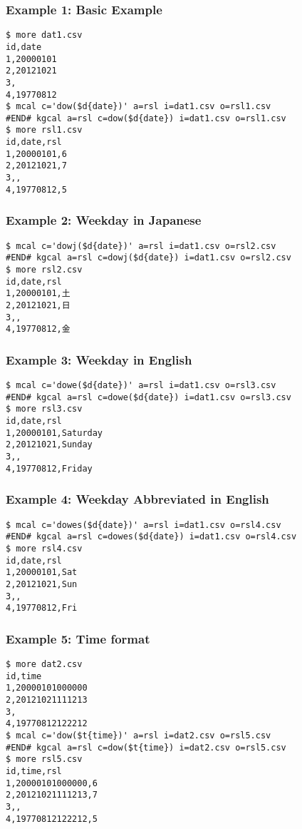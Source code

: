 \subsubsection*{Example 1: Basic Example}



\begin{Verbatim}[baselinestretch=0.7,frame=single]
$ more dat1.csv
id,date
1,20000101
2,20121021
3,
4,19770812
$ mcal c='dow($d{date})' a=rsl i=dat1.csv o=rsl1.csv
#END# kgcal a=rsl c=dow($d{date}) i=dat1.csv o=rsl1.csv
$ more rsl1.csv
id,date,rsl
1,20000101,6
2,20121021,7
3,,
4,19770812,5
\end{Verbatim}
\subsubsection*{Example 2: Weekday in Japanese }



\begin{Verbatim}[baselinestretch=0.7,frame=single]
$ mcal c='dowj($d{date})' a=rsl i=dat1.csv o=rsl2.csv
#END# kgcal a=rsl c=dowj($d{date}) i=dat1.csv o=rsl2.csv
$ more rsl2.csv
id,date,rsl
1,20000101,土
2,20121021,日
3,,
4,19770812,金
\end{Verbatim}
\subsubsection*{Example 3: Weekday in English}



\begin{Verbatim}[baselinestretch=0.7,frame=single]
$ mcal c='dowe($d{date})' a=rsl i=dat1.csv o=rsl3.csv
#END# kgcal a=rsl c=dowe($d{date}) i=dat1.csv o=rsl3.csv
$ more rsl3.csv
id,date,rsl
1,20000101,Saturday
2,20121021,Sunday
3,,
4,19770812,Friday
\end{Verbatim}
\subsubsection*{Example 4: Weekday Abbreviated in English }



\begin{Verbatim}[baselinestretch=0.7,frame=single]
$ mcal c='dowes($d{date})' a=rsl i=dat1.csv o=rsl4.csv
#END# kgcal a=rsl c=dowes($d{date}) i=dat1.csv o=rsl4.csv
$ more rsl4.csv
id,date,rsl
1,20000101,Sat
2,20121021,Sun
3,,
4,19770812,Fri
\end{Verbatim}
\subsubsection*{Example 5: Time format}



\begin{Verbatim}[baselinestretch=0.7,frame=single]
$ more dat2.csv
id,time
1,20000101000000
2,20121021111213
3,
4,19770812122212
$ mcal c='dow($t{time})' a=rsl i=dat2.csv o=rsl5.csv
#END# kgcal a=rsl c=dow($t{time}) i=dat2.csv o=rsl5.csv
$ more rsl5.csv
id,time,rsl
1,20000101000000,6
2,20121021111213,7
3,,
4,19770812122212,5
\end{Verbatim}
